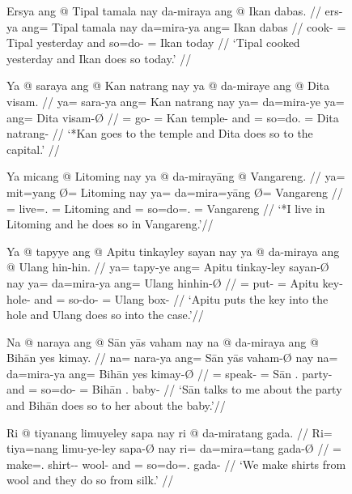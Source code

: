\begin{figure}[h]
\ex\label{ex:dosovalid}\begingl
	\gla Ersya ang @ Tipal tamala nay da-miraya ang @ Ikan dabas. //
	\glb ers-ya ang= Tipal tamala nay da=mira-ya ang= Ikan  dabas //
	\glc cook-\TsgM{} \Aarg{}= Tipal yesterday and so=do-\TsgM{} \Aarg{}=
		Ikan today //
	\glft `Tipal cooked yesterday and Ikan does so today.' //
\endgl\xe
\end{figure}

\begin{figure}
\pex\label{ex:compltrdoso}
\a\label{ex:compltrdoso_1}%
\ljudge*\begingl
	\gla Ya @ saraya ang @ Kan natrang nay ya @ da-miraye ang @ Dita
		visam. //
	\glb ya= sara-ya ang= Kan natrang nay ya= da=mira-ye ya= ang= Dita 
		visam-Ø //
	\glc \LocT{}= go-\TsgM{} \Aarg{}= Kan temple-\Top{} and \LocT{}= 
		so=do.\TsgF{} \Aarg{}= Dita natrang-\Top{} //
	\glft `*Kan goes to the temple and Dita does so to the capital.' //
\endgl

\a\label{ex:compltrdoso_2}%
\ljudge*\begingl
	\gla Ya micang {} @ Litoming nay ya @ da-mirayāng {} @ Vangareng. //
	\glb ya= mit=yang Ø= Litoming nay ya= da=mira=yāng Ø= Vangareng //
	\glc \LocT{}= live=\Fsg{}.\Aarg{} \Top{}= Litoming and \LocT{}=
		so=do=\TsgM{}.\Aarg{} \Top{}= Vangareng //
	\glft `*I live in Litoming and he does so in Vangareng.'//
\endgl

\a\label{ex:compltrdoso_3}%
\ljudge*\begingl
	\gla Ya @ tapyye ang @ Apitu tinkayley sayan nay ya @ da-miraya ang @ 
		Ulang hin-hin. //
	\glb ya= tapy-ye ang= Apitu tinkay-ley sayan-Ø nay ya= da=mira-ya ang=
		Ulang hin\til{}hin-Ø //
	\glc \LocT{}= put-\TsgF{} \Aarg{}= Apitu key-\PargI{} hole-\Top{} and
		\LocT{}= so-do-\TsgM{} \Aarg{}= Ulang box\til{}\Dim{}-\Top{} //
	\glft `Apitu puts the key into the hole and Ulang does so into the case.'//
\endgl

\a\label{ex:compltrdoso_4}%
\ljudge*\begingl
	\gla Na @ naraya ang @ Sān yās vaham nay na @ da-miraya ang @ Bihān yes
		kimay. //
	\glb na= nara-ya ang= Sān yās vaham-Ø nay na= da=mira-ya ang= Bihān yes
		kimay-Ø //
	\glc \GenT{}= speak-\TsgM{} \Aarg{}= Sān \Fsg{}.\Parg{} party-\Top{}
		and \GenT{}= so=do-\TsgM{} \Aarg{}= Bihān \TsgF{}.\Parg{}
		baby-\Top{} //
	\glft `Sān talks to me about the party and Bihān does so to her about the
		baby.'//
\endgl

\a\label{ex:compltrdoso_5}%
\ljudge*\begingl
	\gla Ri @ tiyanang limuyeley sapa nay ri @ da-miratang gada. //
	\glb Ri= tiya=nang limu-ye-ley sapa-Ø nay ri= da=mira=tang gada-Ø //
	\glc \InsT{}= make=\Fpl{}.\Aarg{} shirt-\Pl{}-\PargI{} wool-\Top{} and
		\InsT{}= so=do=\TplM{}.\Aarg{} gada-\Top{} //
	\glft `We make shirts from wool and they do so from silk.' //
\endgl

\xe
\end{figure}

